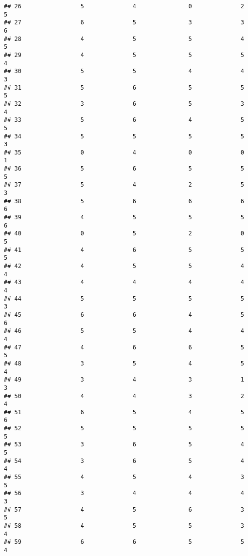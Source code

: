 \documentclass[
]{article}
\begin{document}
\begin{verbatim}
## 26                 5              4               0              2       5
## 27                 6              5               3              3       6
## 28                 4              5               5              4       5
## 29                 4              5               5              5       4
## 30                 5              5               4              4       3
## 31                 5              6               5              5       5
## 32                 3              6               5              3       4
## 33                 5              6               4              5       5
## 34                 5              5               5              5       3
## 35                 0              4               0              0       1
## 36                 5              6               5              5       5
## 37                 5              4               2              5       3
## 38                 5              6               6              6       6
## 39                 4              5               5              5       6
## 40                 0              5               2              0       5
## 41                 4              6               5              5       5
## 42                 4              5               5              4       4
## 43                 4              4               4              4       4
## 44                 5              5               5              5       3
## 45                 6              6               4              5       6
## 46                 5              5               4              4       4
## 47                 4              6               6              5       5
## 48                 3              5               4              5       4
## 49                 3              4               3              1       3
## 50                 4              4               3              2       4
## 51                 6              5               4              5       6
## 52                 5              5               5              5       5
## 53                 3              6               5              4       5
## 54                 3              6               5              4       4
## 55                 4              5               4              3       5
## 56                 3              4               4              4       3
## 57                 4              5               6              3       5
## 58                 4              5               5              3       4
## 59                 6              6               5              5       4

\end{verbatim}
\end{document}

